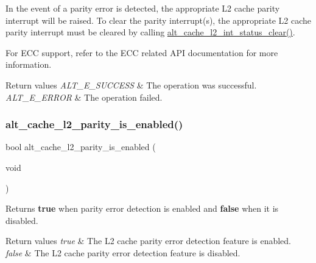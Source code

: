 In the event of a parity error is detected, the appropriate L2 cache parity interrupt will be raised. To clear the parity interrupt(s), the appropriate L2 cache parity interrupt must be cleared by calling \mbox{\hyperlink{group__CACHE__L2_gac5f93b2bfd3a80f19e24e196164d13d4}{alt\+\_\+cache\+\_\+l2\+\_\+int\+\_\+status\+\_\+clear()}}.

For E\+CC support, refer to the E\+CC related A\+PI documentation for more information.


\begin{DoxyRetVals}{Return values}
{\em A\+L\+T\+\_\+\+E\+\_\+\+S\+U\+C\+C\+E\+SS} & The operation was successful. \\
\hline
{\em A\+L\+T\+\_\+\+E\+\_\+\+E\+R\+R\+OR} & The operation failed. \\
\hline
\end{DoxyRetVals}
\mbox{\label{group__CACHE__L2_gaf3286f34867940e182bf7fbb467521e1}} 
\subsubsection{\texorpdfstring{alt\_cache\_l2\_parity\_is\_enabled()}{alt\_cache\_l2\_parity\_is\_enabled()}}
{\footnotesize\ttfamily bool alt\+\_\+cache\+\_\+l2\+\_\+parity\+\_\+is\+\_\+enabled (\begin{DoxyParamCaption}\item[{void}]{ }\end{DoxyParamCaption})}

Returns {\bfseries{true}} when parity error detection is enabled and {\bfseries{false}} when it is disabled.


\begin{DoxyRetVals}{Return values}
{\em true} & The L2 cache parity error detection feature is enabled. \\
\hline
{\em false} & The L2 cache parity error detection feature is disabled. \\
\hline
\end{DoxyRetVals}
\mbox{\label{group__CACHE__L2_ga3bc22bfb8ce2160c21b95725863fec16}} 
